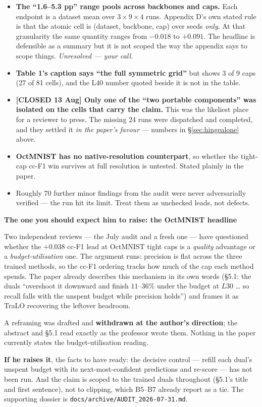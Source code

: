 \documentclass[11pt,a4paper]{article}
\newenvironment{callout}[1]
  {\par\medskip\noindent\begin{lrbox}{\calloutbox}%
   \begin{minipage}{\dimexpr\linewidth-20pt\relax}%
   \textbf{#1}\par\smallskip}
  {\end{minipage}\end{lrbox}%
   \setlength{\fboxsep}{10pt}%
   \colorbox{boxgrey}{\usebox{\calloutbox}}\par\medskip}
\begin{document}
\begin{itemize}
\item \textbf{The ``1.6--5.3 pp'' range pools across backbones and caps.} Each endpoint is
a dataset mean over $3\times9\times4$ runs. Appendix D's own stated rule is that the atomic
cell is (dataset, backbone, cap) over seeds \emph{only}. At that granularity the same
quantity ranges from $-0.018$ to $+0.091$. The headline is defensible as a summary but it
is not scoped the way the appendix says to scope things. \emph{Unresolved --- your call.}
\item \textbf{Table 1's caption says ``the full symmetric grid''} but shows 3 of 9 caps
(27 of 81 cells), and the L40 number quoted beside it is not in the table.
\item \textbf{\textcolor{revred}{[CLOSED 13 Aug]} Only one of the ``two portable
components'' was isolated on the cells that carry the claim.} This was the likeliest place
for a reviewer to press. The missing 24 runs were dispatched and completed, and they
settled it \emph{in the paper's favour} --- numbers in \S\ref{sec:hingealone} above.
\item \textbf{OctMNIST has no native-resolution counterpart}, so whether the tight-cap cc-F1
win survives at full resolution is untested. Stated plainly in the paper.
\item Roughly 70 further minor findings from the audit were never adversarially verified ---
the run hit its limit. Treat them as unchecked leads, not defects.
\end{itemize}

\begin{callout}{The one you should expect him to raise: the OctMNIST headline}
Two independent reviews --- the July audit and a fresh one --- have questioned whether the
$+0.038$ cc-F1 lead at OctMNIST tight caps is a \emph{quality} advantage or a
\emph{budget-utilisation} one. The argument runs: precision is flat across the three
trained methods, so the cc-F1 ordering tracks how much of the cap each method spends. The
paper already describes this mechanism in its own words (\S5.1: the duals ``overshoot it
downward and finish $11$--$36\%$ under the budget at $L30$ \ldots{} so recall falls with
the unspent budget while precision holds'') and frames it as TraLO recovering the leftover
headroom.

\smallskip
A reframing was drafted and \textbf{withdrawn at the author's direction}; the abstract and
\S5.1 read exactly as the professor wrote them. Nothing in the paper currently states the
budget-utilisation reading.

\smallskip
\textbf{If he raises it}, the facts to have ready: the decisive control --- refill each
dual's unspent budget with its next-most-confident predictions and re-score --- has not
been run. And the claim is scoped to the trained duals throughout (\S5.1's title and first
sentence), not to clipping, which B5--B7 already report as a tie. The supporting dossier
is \texttt{docs/archive/AUDIT\_2026-07-31.md}.
\end{callout}
\end{document}
